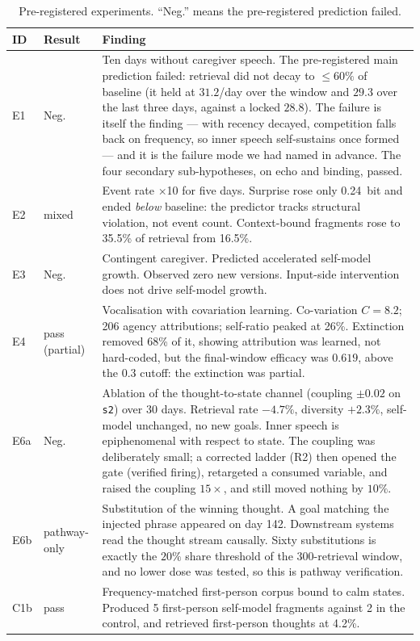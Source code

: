 \documentclass[11pt]{article}
\begin{document}
\begin{table}[h]
\centering
\small
\caption{Pre-registered experiments. ``Neg.'' means the pre-registered prediction failed.}
\label{tab:exp}
\begin{tabular}{@{}lL{1.5cm}L{7.7cm}@{}}
\toprule
ID & Result & Finding \\
\midrule
E1 & Neg. & Ten days without caregiver speech. The pre-registered main prediction failed: retrieval did not decay to $\le60\%$ of baseline (it held at $31.2$/day over the window and $29.3$ over the last three days, against a locked $28.8$). The failure is itself the finding --- with recency decayed, competition falls back on frequency, so inner speech self-sustains once formed --- and it is the failure mode we had named in advance. The four secondary sub-hypotheses, on echo and binding, passed. \\
E2 & mixed & Event rate $\times$10 for five days. Surprise rose only 0.24~bit and ended \emph{below} baseline: the predictor tracks structural violation, not event count. Context-bound fragments rose to 35.5\% of retrieval from 16.5\%. \\
E3 & Neg. & Contingent caregiver. Predicted accelerated self-model growth. Observed zero new versions. Input-side intervention does not drive self-model growth. \\
E4 & pass (partial) & Vocalisation with covariation learning. Co-variation $C=8.2$; 206 agency attributions; self-ratio peaked at 26\%. Extinction removed 68\% of it, showing attribution was learned, not hard-coded, but the final-window efficacy was $0.619$, above the $0.3$ cutoff: the extinction was partial. \\
E6a & Neg. & Ablation of the thought-to-state channel (coupling $\pm0.02$ on \texttt{s2}) over 30 days. Retrieval rate $-4.7\%$, diversity $+2.3\%$, self-model unchanged, no new goals. Inner speech is epiphenomenal with respect to state. The coupling was deliberately small; a corrected ladder (R2) then opened the gate (verified firing), retargeted a consumed variable, and raised the coupling $15\times$, and still moved nothing by $10\%$. \\
E6b & pathway-only & Substitution of the winning thought. A goal matching the injected phrase appeared on day 142. Downstream systems read the thought stream causally. Sixty substitutions is exactly the $20\%$ share threshold of the 300-retrieval window, and no lower dose was tested, so this is pathway verification. \\
C1b & pass & Frequency-matched first-person corpus bound to calm states. Produced 5 first-person self-model fragments against 2 in the control, and retrieved first-person thoughts at 4.2\%. \\

\end{tabular}
\end{table}
\end{document}
